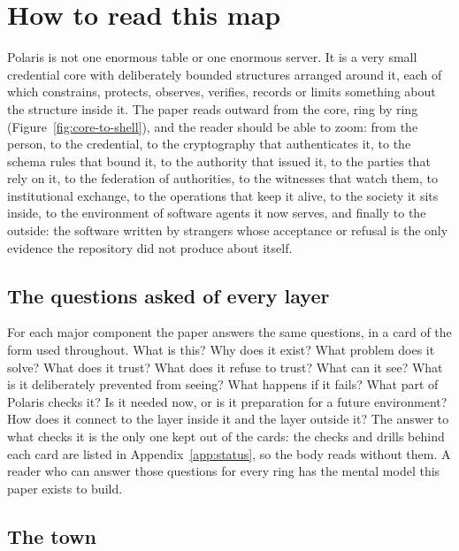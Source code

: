 \section{How to read this map}
\label{sec:reading}

Polaris is not one enormous table or one enormous server. It is a very small credential core with
deliberately bounded structures arranged around it, each of which constrains, protects, observes,
verifies, records or limits something about the structure inside it. The paper reads outward from
the core, ring by ring (Figure~\ref{fig:core-to-shell}), and the reader should be able to zoom:
from the person, to the credential, to the cryptography that authenticates it, to the schema rules
that bound it, to the authority that issued it, to the parties that rely on it, to the federation of
authorities, to the witnesses that watch them, to institutional exchange, to the operations that
keep it alive, to the society it sits inside, to the environment of software agents it now serves,
and finally to the outside: the software written by strangers whose acceptance or refusal is the only
evidence the repository did not produce about itself.

\subsection{The questions asked of every layer}

For each major component the paper answers the same questions, in a card of the form used
throughout. What is this? Why does it exist? What problem does it solve? What does it trust? What
does it refuse to trust? What can it see? What is it deliberately prevented from seeing? What happens
if it fails? What part of Polaris checks it? Is it needed now, or is it preparation for a future
environment? How does it connect to the layer inside it and the layer outside it? The answer to what
checks it is the only one kept out of the cards: the checks and drills behind each card are listed
in Appendix~\ref{app:status}, so the body reads without them. A reader who can answer those
questions for every ring has the mental model this paper exists to build.

\subsection{The town}

